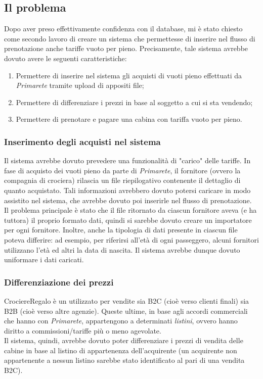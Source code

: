 \subsection{Il problema}
Dopo aver preso effettivamente confidenza con il database, mi è stato chiesto come secondo lavoro di creare un sistema che permettesse di inserire nel flusso di prenotazione anche tariffe vuoto per pieno. Precisamente, tale sistema avrebbe dovuto avere le seguenti caratteristiche:
\begin{enumerate}
	\item Permettere di inserire nel sistema gli acquisti di vuoti pieno effettuati da \textit{Primarete} tramite upload di appositi file;
	\item Permettere di differenziare i prezzi in base al soggetto a cui si sta vendendo;
	\item Permettere di prenotare e pagare una cabina con tariffa vuoto per pieno.
\end{enumerate}

\subsubsection{Inserimento degli acquisti nel sistema}
Il sistema avrebbe dovuto prevedere una funzionalità di "carico" delle tariffe. In fase di acquisto dei vuoti pieno da parte di \textit{Primarete}, il fornitore (ovvero la compagnia di crociera) rilascia un file riepilogativo contenente il dettaglio di quanto acquistato. Tali informazioni avrebbero dovuto potersi caricare in modo assistito nel sistema, che avrebbe dovuto poi inserirle nel flusso di prenotazione.\\
Il problema principale è stato che il file ritornato da ciascun fornitore aveva (e ha tuttora) il proprio formato dati, quindi si sarebbe dovuto creare un importatore per ogni fornitore. Inoltre, anche la tipologia di dati presente in ciascun file poteva differire: ad esempio, per riferirsi all'età di ogni passeggero, alcuni fornitori utilizzano l'età ed altri la data di nascita. Il sistema avrebbe dunque dovuto uniformare i dati caricati.

\subsubsection{Differenziazione dei prezzi}
CrociereRegalo è un \bookingEngine utilizzato per vendite sia B2C (cioè verso clienti finali) sia B2B (cioè verso altre agenzie). Queste ultime, in base agli accordi commerciali che hanno con \textit{Primarete}, appartengono a determinati \textit{listini}, ovvero hanno diritto a commissioni/tariffe più o meno agevolate.\\Il sistema, quindi, avrebbe dovuto poter differenziare i prezzi di vendita delle cabine in base al listino di appartenenza dell'acquirente (un acquirente non appartenente a nessun listino sarebbe stato identificato al pari di una vendita B2C).

